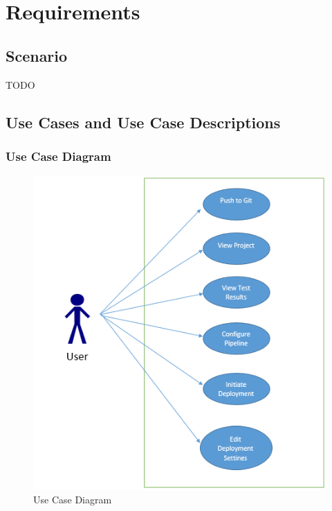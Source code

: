 \chapter{Requirements}


\section{Scenario}
TODO

\section{Use Cases and Use Case Descriptions}
  \subsection{Use Case Diagram}
    \begin{figure}[H]
        \includegraphics[width = 1.2\linewidth]{diagrams/UseCaseDiagram}
        \caption{Use Case Diagram}
        \label{fig:use_case_diagram}
      \end{figure}
      
